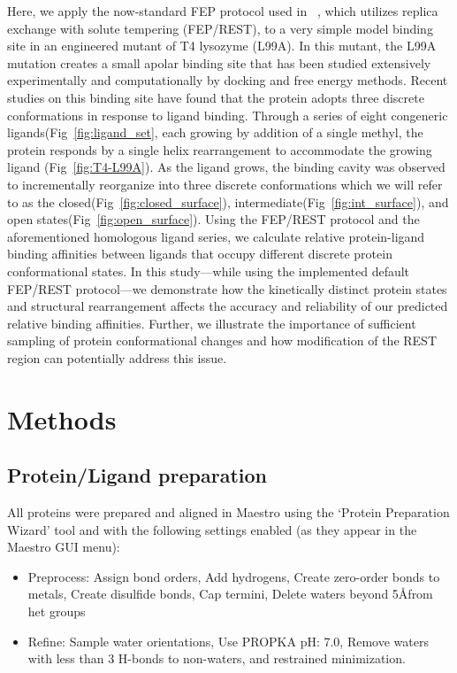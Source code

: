 \documentclass[journal=jctcce,manuscript=article]{achemso}
\begin{document}
Here, we apply the now-standard FEP protocol used in ~\cite{FEPplus}, which utilizes replica exchange with solute tempering (FEP/REST)\cite{FEP/REST}, to a very simple model binding site in an engineered mutant of T4 lysozyme (L99A).
In this mutant, the L99A mutation creates a small apolar binding site that has been studied extensively experimentally\cite{eriksson1992response,eriksson1993similar,T4affinity,doi:10.1021/bi00027a007} and computationally by docking\cite{wei2002model,wei2004testing,graves2005decoys,Merski2015} and free energy methods\cite{Mobley20071118,hermans1997inclusion,boresch2003absolute,deng2006calculation,mann2000modeling,Boyce2009,FEP/REST,FEP/RESTapp}.
Recent studies on this binding site have found that the protein adopts three discrete conformations in response to ligand binding\cite{Merski2015}.
Through a series of eight congeneric ligands(Fig~\ref{fig:ligand_set}, each growing by addition of a single methyl, the protein responds by a single helix rearrangement to accommodate the growing ligand (Fig~\ref{fig:T4-L99A}).
As the ligand grows, the binding cavity was observed to incrementally reorganize into three discrete conformations which we will refer to as the closed(Fig~\ref{fig:closed_surface}), intermediate(Fig~\ref{fig:int_surface}), and open states(Fig~\ref{fig:open_surface}).
Using the FEP/REST protocol and the aforementioned homologous ligand series, we calculate relative protein-ligand binding affinities between ligands that occupy different discrete protein conformational states.
In this study---while using the implemented default FEP/REST protocol---we demonstrate how the kinetically distinct protein states and structural rearrangement affects the accuracy and reliability of our predicted relative binding affinities.
Further, we illustrate the importance of sufficient sampling of protein conformational changes and how modification of the REST region can potentially address this issue.

\section{Methods}
\subsection*{Protein/Ligand preparation}
All proteins were prepared and aligned in Maestro\cite{Maestro} using the `Protein Preparation Wizard'\cite{ProteinPrepWizSoftware,Epik,Impact,Prime,ProteinPrepWizPaper} tool and with the following settings enabled (as they appear in the Maestro GUI menu):
   \begin{itemize}
   \item Preprocess: Assign bond orders, Add hydrogens, Create zero-order bonds to metals, Create disulfide bonds, Cap termini, Delete waters beyond 5\AA  from het groups
   \item Refine: Sample water orientations, Use PROPKA pH: 7.0, Remove waters with less than 3 H-bonds to non-waters, and restrained minimization.
   \end{itemize}
\end{document}
